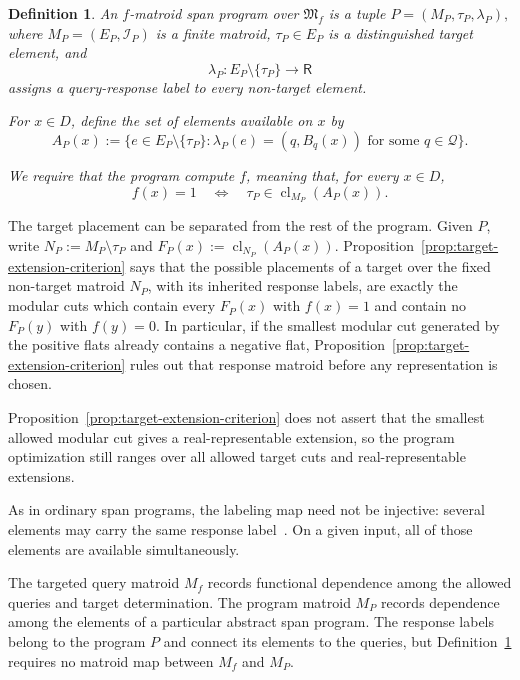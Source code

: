 \documentclass[11pt]{article}
\numberwithin{equation}{section}
\newtheorem{definition}{Definition}[section]
\theoremstyle{remark}
\newcommand{\cl}{\operatorname{cl}}
\begin{document}
\begin{definition}
\label{def:f-matroid-span-program}
An \emph{$f$-matroid span program over $\mathfrak M_f$} is a tuple
\(
P=(M_P,\tau_P,\lambda_P),
\)
where $M_P=(E_P,\mathcal I_P)$ is a finite matroid, $\tau_P\in E_P$ is a
distinguished target element, and
\begin{equation}
    \lambda_P:
    E_P\setminus\{\tau_P\}
    \longrightarrow
    \mathsf R
\end{equation}
assigns a query-response label to every non-target element.

For $x\in D$, define the set of elements available on $x$ by
\begin{equation}
    A_P(x)
    :=
    \{
        e\in E_P\setminus\{\tau_P\}:
        \lambda_P(e)=(q,B_q(x))
        \text{ for some }q\in\mathcal Q
    \}.
\end{equation}

We require that the program compute $f$, meaning that, for every $x\in D$,
\begin{equation}
    f(x)=1
    \quad\Longleftrightarrow\quad
    \tau_P\in\cl_{M_P}(A_P(x)).
\end{equation}
\end{definition}

The target placement can be separated from the rest of the program. Given $P$, write $N_P:=M_P\setminus\tau_P$ and $F_P(x):=\cl_{N_P}(A_P(x))$.
Proposition~\ref{prop:target-extension-criterion} says that the possible
placements of a target over the fixed non-target matroid $N_P$, with its
inherited response labels, are exactly the modular cuts which contain every $F_P(x)$ with $f(x)=1$ and
contain no $F_P(y)$ with $f(y)=0$. In particular, if the smallest modular cut generated by the positive flats
already contains a negative flat, Proposition~\ref{prop:target-extension-criterion}
rules out that response matroid before any representation is chosen.

Proposition~\ref{prop:target-extension-criterion} does not assert that the smallest allowed modular cut gives a real-representable extension, so the program optimization still ranges over all allowed target cuts and real-representable extensions.

As in ordinary span programs, the labeling map need not be injective:
several elements may carry the same response label~\cite{Reichardt2009}. On
a given input, all of those elements are available simultaneously.

The targeted query matroid $M_f$ records functional dependence among the
allowed queries and target determination. The program matroid $M_P$ records
dependence among the elements of a particular abstract span program. The
response labels belong to the program $P$ and connect its elements to the
queries, but Definition~\ref{def:f-matroid-span-program} requires no matroid
map between $M_f$ and $M_P$.
\end{document}
